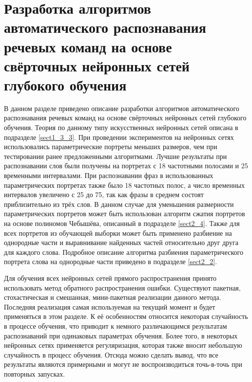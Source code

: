 \chapter{Разработка алгоритмов автоматического распознавания речевых команд на основе свёрточных нейронных сетей глубокого обучения} \label{chapt4}

В данном разделе приведено описание разработки алгоритмов автоматического распознавания речевых команд на основе свёрточных нейронных сетей глубокого обучения.
Теория по данному типу искусственных нейронных сетей описана в подразделе \ref{sect1_3_3}.
При проведении экспериментов на нейронных сетях использовались параметрические портреты меньших размеров, чем при тестировании ранее предложенными алгоритмами.
Лучшие результаты при распознавании слов были получены на портретах с 18 частотными полосами и 25 временными интервалами.
При распознавании фраз в использованных параметрических портретах также было 18 частотных полос, а число временных интервалов увеличено с 25 до 75, так как фразы в среднем состоят приблизительно из трёх слов.
В данном случае для уменьшения размерности параметрических портретов может быть использован алгоритм сжатия портретов на основе полиномов Чебышёва, описанный в подразделе \ref{sect2_4}.
Также для всех портретов из обучающей выборки может быть применено разбиение на однородные части и выравнивание найденных частей относительно друг друга для каждого слова.
Подробное описание алгоритма разбиения параметрического портрета слова на однородные части приведено в подразделе \ref{sect2_2}.

Для обучения всех нейронных сетей прямого распространения принято использовать метод обратного распространения ошибки.
Существуют пакетная, стохастическая и смешанная, мини-пакетная реализации данного метода.
Последняя реализация самая используемая на текущий момент и будет применяться в этом разделе.
К её особенностям относится некоторая случайность в процессе обучения, что приводит к немного различающимся результатам распознаваний при одинаковых параметрах обучения.
Более того, в некоторых нейронных сетях применяется регуляризация, которая также вносит небольшую случайность в процесс обучения.
Отсюда можно сделать вывод, что все результаты являются примерными и могут не воспроизводиться точь-в-точь при повторных запусках.

